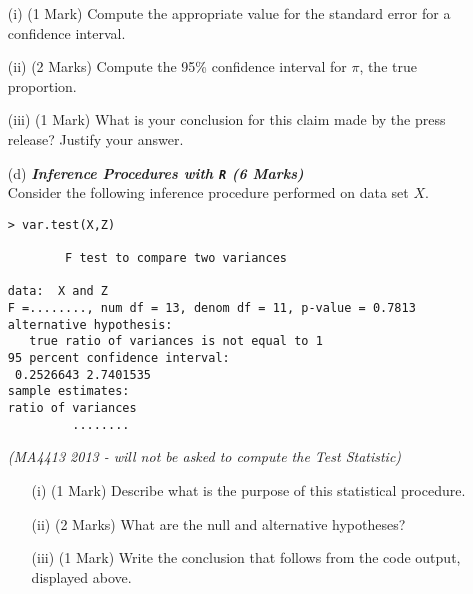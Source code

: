 \documentclass[]{article}
\begin{document}
\begin{itemize}



\begin{itemize}
\item[(i)] (1 Mark) Compute the appropriate value for the standard error for a confidence interval.
\item[(ii)] (2 Marks) Compute the 95\% confidence interval for $\pi$, the true proportion.
\item[(iii)] (1 Mark) What is your conclusion for this claim made by the press release? Justify your answer.
\end{itemize}
\end{itemize}

%
\newpage
\begin{itemize}
\item[(d)] \textbf{\textit{ Inference Procedures with \texttt{R} (6 Marks)}}\\
Consider the following inference procedure performed on data set $X$.
\begin{center}
\begin{framed}
\begin{verbatim}
> var.test(X,Z)

        F test to compare two variances

data:  X and Z 
F =........, num df = 13, denom df = 11, p-value = 0.7813
alternative hypothesis: 
   true ratio of variances is not equal to 1 
95 percent confidence interval:
 0.2526643 2.7401535 
sample estimates:
ratio of variances 
         ........

\end{verbatim}
\end{framed}
\end{center}
\textit{(MA4413 2013 - will not be asked to compute the Test Statistic)}
\begin{itemize}
\item[(i)] (1 Mark) Describe what is the purpose of this statistical procedure.
\item[(ii)] (2 Marks) What are the null and alternative hypotheses?
\item[(iii)] (1 Mark) Write the conclusion that follows from the code output, displayed above.
\end{itemize}
\end{itemize}
\end{document}

